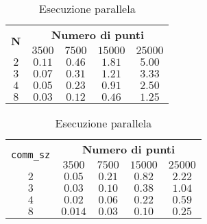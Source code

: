 \documentclass[a4paper, 11pt]{article}
\theoremstyle{definition}
\theoremstyle{remark}
\begin{document}
\begin{table}
\centering
\setlength\tabcolsep{4pt}
\begin{minipage}{0.48\textwidth}
\centering
\begin{tabular}{c|cccc}
\multirow{2}{*}{\textbf{N}}
  & \multicolumn{4}{c}{\textbf{Numero di punti}} \\
  & $3500$ & $7500$ & $15000$ & $25000$ \\
\hline
$2$ & $0.11$ & $0.46$ & $1.81$ & $5.00$ \\
$3$ & $0.07$ & $0.31$ & $1.21$ & $3.33$ \\
$4$ & $0.05$ & $0.23$ & $0.91$ & $2.50$ \\
$8$ & $0.03$ & $0.12$ & $0.46$ & $1.25$ \\
\end{tabular}
\caption{Esecuzione seriale}
\label{t1}
\end{minipage}
\hfill
\begin{minipage}{0.48\textwidth}
\centering
\begin{tabular}{c|cccc}
\multirow{2}{*}{\texttt{comm\_sz}}
  & \multicolumn{4}{c}{\textbf{Numero di punti}} \\
  & $3500$ & $7500$ & $15000$ & $25000$ \\
\hline
$2$ & $0.05$ & $0.21$ & $0.82$ & $2.22$ \\
$3$ & $0.03$ & $0.10$ & $0.38$ & $1.04$ \\
$4$ & $0.02$ & $0.06$ & $0.22$ & $0.59$ \\
$8$ & $0.014$ & $0.03$ & $0.10$ & $0.25$ \\
\end{tabular}
\caption{Esecuzione parallela}
\label{t2}
\end{minipage}

\end{table}
\end{document}

